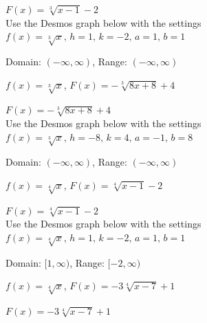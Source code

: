 \documentclass{ximera}
\begin{document}
\begin{question}
\begin {problem}
\begin{solution}
$F(x) = \sqrt[3]{x-1}-2$ \\ 

Use the Desmos graph below with the settings $f(x)=\sqrt[3]{x},\,h=1,\,k=-2,\,a=1,\,b=1$

\begin{center} 
\end{center}

Domain:  $(-\infty, \infty)$, Range: $(-\infty, \infty)$
\end{solution}
\end {problem}

\begin {problem}
$f(x) = \sqrt[3]{x}$, $F(x) = -\sqrt[3]{8x + 8} + 4$ 

\begin{solution}
$F(x) = -\sqrt[3]{8x + 8} + 4$\\

Use the Desmos graph below with the settings $f(x)=\sqrt[3]{x},\,h=-8,\,k=4,\,a=-1,\,b=8$

\begin{center} 
\end{center}

Domain:  $(-\infty, \infty)$, Range: $(-\infty, \infty)$

\end{solution}
\end {problem}

\begin {problem}
$f(x) = \sqrt[4]{x}$, $F(x) = \sqrt[4]{x-1}-2$
\begin{solution}
$F(x) = \sqrt[4]{x-1}-2$\\

Use the Desmos graph below with the settings $f(x)=\sqrt[4]{x},\,h=1,\,k=-2,\,a=1,\,b=1$

\begin{center} 
\end{center}

Domain:  $[1, \infty)$, Range: $[-2, \infty)$
\end{solution}

\end {problem}

\begin {problem}
$f(x) = \sqrt[4]{x}$, $F(x) = -3\sqrt[4]{x - 7} +1$

\begin{solution}
$F(x) = -3\sqrt[4]{x - 7} +1$\\


\end{solution}
\end{problem}
\end{question}
\end{document}
